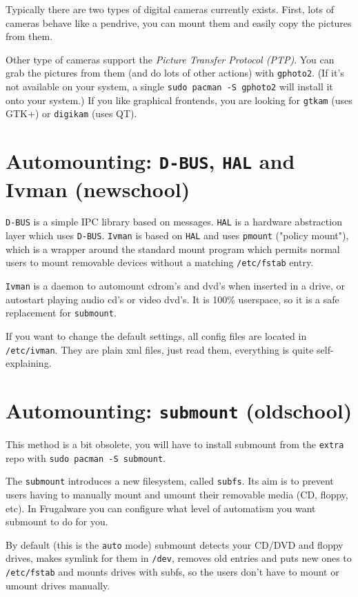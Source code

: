 Typically there are two types of digital cameras currently exists. First, lots of cameras behave like a pendrive, you can mount them and easily copy the pictures from them.

Other type of cameras support the \textit{Picture Transfer Protocol (PTP)}.
You can grab the pictures from them (and do lots of other actions) with
{\tt gphoto2}. (If it's not available on your system, a single
{\tt sudo pacman -S gphoto2} will install it onto your system.) If you like
graphical frontends, you are looking for {\tt gtkam} (uses GTK+) or
{\tt digikam} (uses QT).

\section{Automounting: {\tt D-BUS}, {\tt HAL} and {Ivman} (newschool)}

{\tt D-BUS} is a simple IPC library based on messages. {\tt HAL} is a hardware
abstraction layer which uses {\tt D-BUS}. {\tt Ivman} is based on {\tt HAL} and
uses {\tt pmount} ("policy mount"), which is a wrapper around the standard
mount program which permits normal users to mount removable devices without a
matching {\tt /etc/fstab} entry.

{\tt Ivman} is a daemon to automount cdrom's and dvd's when inserted in a
drive, or autostart playing audio cd's or video dvd's. It is 100\% userspace,
so it is a safe replacement for {\tt submount}.

If you want to change the default settings, all config files are located in
{\tt /etc/ivman}. They are plain xml files, just read them, everything is
quite self-explaining.

\section{Automounting: {\tt submount} (oldschool)}

This method is a bit obsolete, you will have to install submount from the
{\tt extra} repo with {\tt sudo pacman -S submount}.

The {\tt submount} introduces a new filesystem, called {\tt subfs}. Its aim is to prevent users having to manually mount and umount their removable media (CD, floppy, etc). In Frugalware you can configure what level of automatism you want submount to do for you. 

By default (this is the {\tt auto} mode) submount detects your CD/DVD and floppy drives, makes symlink for them in {\tt /dev}, removes old entries and puts new ones to {\tt /etc/fstab} and mounts drives with subfs, so the users don't have to mount or umount drives manually.

